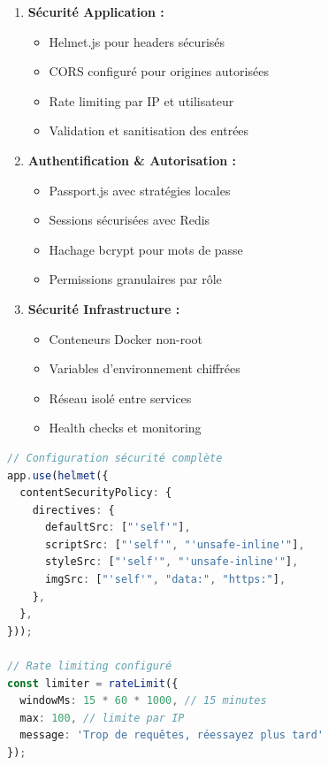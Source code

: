 \begin{enumerate}
    \item \textbf{Sécurité Application :}
    \begin{itemize}
        \item Helmet.js pour headers sécurisés
        \item CORS configuré pour origines autorisées
        \item Rate limiting par IP et utilisateur
        \item Validation et sanitisation des entrées
    \end{itemize}
    
    \item \textbf{Authentification \& Autorisation :}
    \begin{itemize}
        \item Passport.js avec stratégies locales
        \item Sessions sécurisées avec Redis
        \item Hachage bcrypt pour mots de passe
        \item Permissions granulaires par rôle
    \end{itemize}
    
    \item \textbf{Sécurité Infrastructure :}
    \begin{itemize}
        \item Conteneurs Docker non-root
        \item Variables d'environnement chiffrées
        \item Réseau isolé entre services
        \item Health checks et monitoring
    \end{itemize}
\end{enumerate}

\begin{lstlisting}[language=TypeScript, caption=Configuration sécurité Express]
// Configuration sécurité complète
app.use(helmet({
  contentSecurityPolicy: {
    directives: {
      defaultSrc: ["'self'"],
      scriptSrc: ["'self'", "'unsafe-inline'"],
      styleSrc: ["'self'", "'unsafe-inline'"],
      imgSrc: ["'self'", "data:", "https:"],
    },
  },
}));

// Rate limiting configuré
const limiter = rateLimit({
  windowMs: 15 * 60 * 1000, // 15 minutes
  max: 100, // limite par IP
  message: 'Trop de requêtes, réessayez plus tard'
});
\end{lstlisting}

